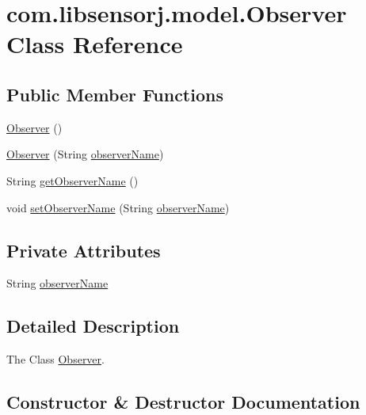 \hypertarget{classcom_1_1libsensorj_1_1model_1_1Observer}{}\section{com.\+libsensorj.\+model.\+Observer Class Reference}
\label{classcom_1_1libsensorj_1_1model_1_1Observer}
\subsection*{Public Member Functions}
\begin{DoxyCompactItemize}
\item 
\hyperlink{classcom_1_1libsensorj_1_1model_1_1Observer_a477725e32a58d3a8762d404799ec0161}{Observer} ()
\item 
\hyperlink{classcom_1_1libsensorj_1_1model_1_1Observer_a4933adee4c8da771eaa94415f6f840a7}{Observer} (String \hyperlink{classcom_1_1libsensorj_1_1model_1_1Observer_aa1f9da7634c35f34d5f20d5bc1562428}{observer\+Name})
\item 
String \hyperlink{classcom_1_1libsensorj_1_1model_1_1Observer_a8b873b9c90ad7f1ed055ea6713e0062a}{get\+Observer\+Name} ()
\item 
void \hyperlink{classcom_1_1libsensorj_1_1model_1_1Observer_a42628ca2b4d99e0df9fe1d70fec811b2}{set\+Observer\+Name} (String \hyperlink{classcom_1_1libsensorj_1_1model_1_1Observer_aa1f9da7634c35f34d5f20d5bc1562428}{observer\+Name})
\end{DoxyCompactItemize}
\subsection*{Private Attributes}
\begin{DoxyCompactItemize}
\item 
String \hyperlink{classcom_1_1libsensorj_1_1model_1_1Observer_aa1f9da7634c35f34d5f20d5bc1562428}{observer\+Name}
\end{DoxyCompactItemize}


\subsection{Detailed Description}
The Class \hyperlink{classcom_1_1libsensorj_1_1model_1_1Observer}{Observer}. 

\subsection{Constructor \& Destructor Documentation}
\hypertarget{classcom_1_1libsensorj_1_1model_1_1Observer_a477725e32a58d3a8762d404799ec0161}{}
